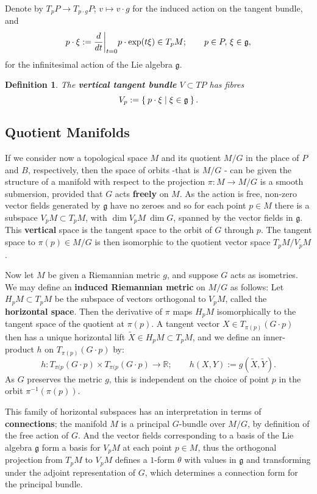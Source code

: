 \documentclass{article}
\newtheorem{defn}[theorem]{Definition\rm}
\newcommand{\ra}{\rightarrow}
\newcommand{\lra}{\longrightarrow}
\newcommand{\RR}{\mathbb{R}}
\newcommand{\mfg}{\mathfrak{g}}
\newcommand\restr[2]{{%
		\left.\kern-\nulldelimiterspace %
		#1 %
		\vphantom{\big|} %
		\right|_{#2} %
}}
\begin{document}
	Denote by $T_{p}P \ra T_{p\cdot g}P$; $v \mapsto v \cdot g$ for the induced action on the tangent bundle, and
	\[
		p \cdot \xi := \restr{\frac{d}{dt}}{t = 0} p \cdot \exp(t\xi) \in T_{p}M; \qquad p \in P,\, \xi \in \mfg,
	\]
	for the infinitesimal action of the Lie algebra $\mfg$. 
	
	\begin{defn}
		The \textbf{vertical tangent bundle} $V \subset TP$ has fibres
		\[
			V_{p} := \Set{ p \cdot \xi | \xi \in \mfg}.
		\]
	\end{defn}
	
	\subsection{Quotient Manifolds}
	
	If we consider now a topological space $M$ and its quotient $M/G$ in the place of $P$ and $B$, respectively, then the space of orbits -that is $M/G$ - can be given the structure of a manifold with respect to the projection $\pi : M \ra M/G$ is a smooth submersion, provided that $G$ acts \textbf{freely} on $M$. As the action is free, non-zero vector fields generated by $\mfg$ have no zeroes and so for each point $p \in M$ there is a subspace $V_{p}M \subset T_{p}M$, with $\dim V_{p}M \ \dim G$, spanned by the vector fields in $\mfg$. This \textbf{vertical} space is the tangent space to the orbit of $G$ through $p$. The tangent space to $\pi(p) \in M/G$ is then isomorphic to the quotient vector space $T_{p}M/V_{p}M$.
	
	Now let $M$ be given a Riemannian metric $g$, and suppose $G$ acts as isometries. We may define an \textbf{induced Riemannian metric} on $M/G$ as follows: Let $H_{p}M \subset T_{p}M$ be the subspace of vectors orthogonal to $V_{p}M$, called the \textbf{horizontal space}. Then the derivative of $\pi$ maps $H_{p}M$ isomorphically to the tangent space of the quotient at $\pi(p)$. A tangent vector $X \in T_{\pi(p)}(G \cdot p)$ then has a unique horizontal lift $\tilde{X} \in H_{p}M \subset T_{p}M$, and we define an inner-product $h$ on $T_{\pi(p)}( G \cdot p)$ by:
	\[
		h : T_{\pi(p}(G \cdot p) \times T_{\pi(p}(G \cdot p) \lra \RR; \qquad h(X,Y) := g(\tilde{X}, \tilde{Y}).
	\]
	As $G$ preserves the metric $g$, this is independent on the choice of point $p$ in the orbit $\pi^{-1}\left(\pi(p)\right)$.
	
	This family of horizontal subspaces has an interpretation in terms of \textbf{connections}; the manifold $M$ is a principal $G$-bundle over $M/G$, by definition of the free action of $G$. And the vector fields corresponding to a basis of the Lie algebra $\mfg$ form a basis for $V_{p}M$ at each point $p \in M$, thus the orthogonal projection from $T_{p}M$ to $V_{p}M$ defines a $1$-form $\theta$ with values in $\mfg$ and transforming under the adjoint representation of $G$, which determines a connection form for the principal bundle.
	
\end{document}
